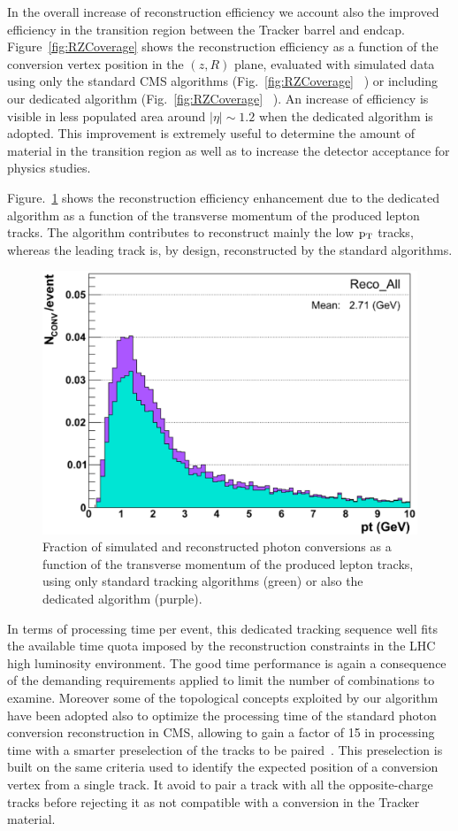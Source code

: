 \documentclass[a4paper]{jpconf}
\begin{document}
In the overall increase of reconstruction efficiency we account also the improved efficiency in the transition region between the Tracker barrel and endcap.  
Figure~\ref{fig:RZCoverage} shows the reconstruction efficiency as a function of the conversion vertex position in the $(z,R)$ plane, evaluated with simulated data using only the standard CMS algorithms (Fig.~\ref{fig:RZCoverage}~ ) or including our dedicated algorithm (Fig.~\ref{fig:RZCoverage}~ ). An increase of efficiency is visible in less populated area around $|\eta| \sim 1.2$ when the dedicated algorithm is adopted. This improvement is extremely useful to determine  the amount of material in the transition region as well as to increase the detector acceptance for physics studies.



Figure.~\ref{fig:ptPerf} shows the reconstruction efficiency enhancement due to the  dedicated algorithm as a function of the transverse momentum of the produced lepton tracks. The algorithm contributes to reconstruct mainly the low $\rm p_T$ tracks, whereas the leading track is, by design, reconstructed by the standard algorithms.

\begin{figure}[h]
\centering
\includegraphics[width=.4\textwidth]{fig/singleLegPt.png}
\caption{Fraction of simulated and reconstructed photon conversions as a function of the transverse momentum of the produced lepton tracks, using only standard tracking algorithms (green) or also the dedicated algorithm (purple). }
\label{fig:ptPerf}
\end{figure}





In terms of processing time per event, this dedicated tracking sequence well fits the available time quota imposed by the reconstruction constraints in the LHC high luminosity  environment.  The good time performance is again a consequence of the demanding requirements applied to limit the number of combinations to examine.
Moreover some of the topological concepts exploited by our algorithm have been adopted also to optimize the processing time of the standard photon conversion reconstruction  in CMS, allowing to gain a factor of 15 in processing time with a smarter preselection of the tracks to be paired~\cite{recoImprovement}. This preselection is built on the same criteria used to identify the expected position of a conversion vertex from a single track. It avoid to pair a track with all the opposite-charge tracks before rejecting it as not compatible with a conversion in the Tracker material.
\end{document}
